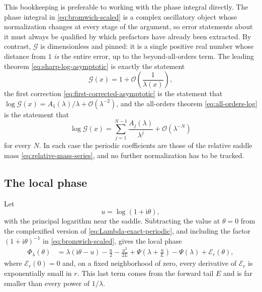 \documentclass[11pt,oneside]{article}
\theoremstyle{definition}
\theoremstyle{remark}
\newcommand{\ii}{\mathrm i}
\newcommand{\bigO}{\mathcal O}
\begin{document}
This bookkeeping is preferable to working with the phase integral directly.  The phase
integral in \eqref{eq:bromwich-scaled} is a complex oscillatory object whose normalization
changes at every stage of the argument, so error statements about it must always be qualified
by which prefactors have already been extracted.  By contrast, $\mathcal G$ is dimensionless
and pinned: it is a single positive real number whose distance from $1$ \emph{is} the entire
error, up to the beyond-all-orders term.  The leading theorem
\eqref{eq:sharp-log-asymptotic} is exactly the statement
\begin{equation}
 \mathcal G(x)=1+\bigO\!\left(\frac1{\lambda(x)}\right),   \label{eq:as-mass-leading}
\end{equation}
the first correction \eqref{eq:first-corrected-asymptotic} is the statement that
$\log\mathcal G(x)=A_1(\lambda)/\lambda+\bigO(\lambda^{-2})$, and the all-orders theorem
\eqref{eq:all-orders-log} is the statement that
\begin{equation}
 \log\mathcal G(x)=\sum_{j=1}^{N-1}\frac{A_j(\lambda)}{\lambda^{j}}
 +\bigO\!\left(\lambda^{-N}\right)                        \label{eq:as-mass-all-orders}
\end{equation}
for every $N$.  In each case the periodic coefficients are those of the relative saddle mass
\eqref{eq:relative-mass-series}, and no further normalization has to be tracked.

\subsection{The local phase}

Let
\begin{equation}
 u=\log(1+\ii\theta),                                     \label{eq:u-log}
\end{equation}
with the principal logarithm near the saddle.  Subtracting the value at $\theta=0$ from the
complexified version of \eqref{eq:Lambda-exact-periodic}, and including the factor
$(1+\ii\theta)^{-1}$ in \eqref{eq:bromwich-scaled}, gives the local phase
\begin{align}
 \Phi_\lambda(\theta)
 &=\lambda(\ii\theta-u)-\frac u2-\frac{u^2}{2L}
   +\Psi\!\left(\lambda+\frac uL\right)-\Psi(\lambda)
   +\mathcal E_r(\theta),                                 \label{eq:local-phase}
\end{align}
where $\mathcal E_r(0)=0$ and, on a fixed neighborhood of zero, every derivative of
$\mathcal E_r$ is exponentially small in $r$.  This last term comes from the forward tail
$E$ and is far smaller than every power of $1/\lambda$.
\end{document}
